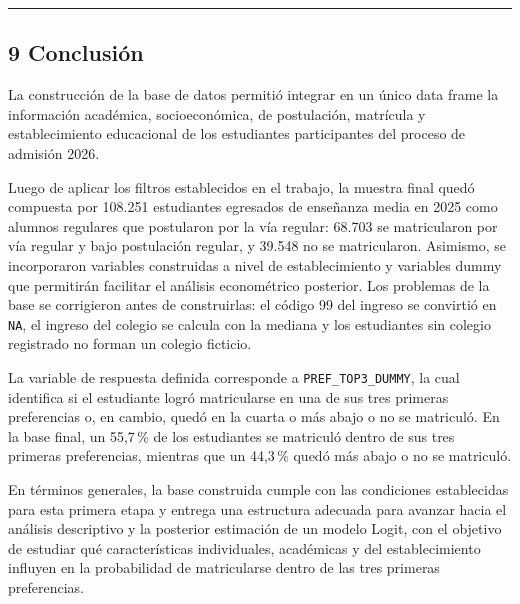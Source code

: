 \documentclass[11pt]{article}
\begin{document}
\medskip\hrule\medskip

\subsection*{9 \; Conclusión}

La construcción de la base de datos permitió integrar en un único data
frame la información académica, socioeconómica, de postulación, matrícula
y establecimiento educacional de los estudiantes participantes del
proceso de admisión 2026.

Luego de aplicar los filtros establecidos en el trabajo, la muestra final
quedó compuesta por 108.251 estudiantes egresados de enseñanza media en
2025 como alumnos regulares que postularon por la vía regular: 68.703 se
matricularon por vía regular y bajo postulación regular, y 39.548 no se
matricularon. Asimismo, se incorporaron variables construidas a
nivel de establecimiento y variables dummy que permitirán facilitar el
análisis econométrico posterior. Los problemas de la base se corrigieron
antes de construirlas: el código 99 del ingreso se convirtió en
\texttt{NA}, el ingreso del colegio se calcula con la mediana y los
estudiantes sin colegio registrado no forman un colegio ficticio.

La variable de respuesta definida corresponde a
\texttt{PREF\_TOP3\_DUMMY}, la cual identifica si el estudiante logró
matricularse en una de sus tres primeras preferencias o, en cambio,
quedó en la cuarta o más abajo o no se matriculó. En la base final, un
55,7\,\% de los estudiantes se matriculó dentro de sus tres primeras
preferencias, mientras que un 44,3\,\% quedó más abajo o no se
matriculó.

En términos generales, la base construida cumple con las condiciones
establecidas para esta primera etapa y entrega una estructura adecuada
para avanzar hacia el análisis descriptivo y la posterior estimación de
un modelo Logit, con el objetivo de estudiar qué características
individuales, académicas y del establecimiento influyen en la
probabilidad de matricularse dentro de las tres primeras preferencias.

\end{document}
